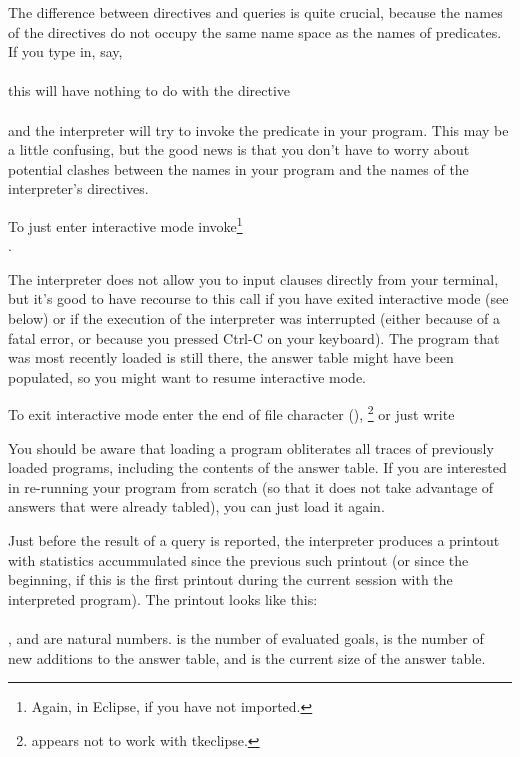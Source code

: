 The difference between directives and queries is quite crucial, because the
names of the directives do not occupy the same name space as the names of
predicates.  If you type in, say,\\
\ind{}\\
this will have nothing to do with the directive\\
\ind{}\\
and the interpreter will try to invoke the predicate  in your
program.  This may be a little confusing, but the good news is that you don't
have to worry about potential clashes between the names in your program and
the names of the interpreter's directives.

To just enter interactive mode invoke\footnote{
  Again,  in Eclipse, if you have not imported.}\\
\ind{}.

The interpreter does not allow you to input clauses directly from your
terminal, but it's good to have recourse to this call if you have exited
interactive mode (see below) or if the execution of the interpreter was
interrupted (either because of a fatal error, or because you pressed Ctrl-C
on your keyboard). The program that was most recently loaded is still there,
the answer table might have been populated, so you might want to resume
interactive mode.

To exit interactive mode enter the end of file character
(),%
\footnote{
   appears not to work with tkeclipse.}
or just write\\
\ind{}

You should be aware that loading a program obliterates all traces of
previously loaded programs, including the contents of the answer table.  If
you are interested in re-running your program from scratch (so that it does
not take advantage of answers that were already tabled), you can just load it
again.

Just before the result of a query is reported, the interpreter produces a
printout with statistics accummulated since the previous
such printout (or since the beginning, if this is the first printout during
the current session with the interpreted program). The printout looks like
this:\\
\ind{}\\
, and  are natural numbers.  is the number of
evaluated goals,  is the number of new additions to the answer table,
and  is the current size of the answer table.



